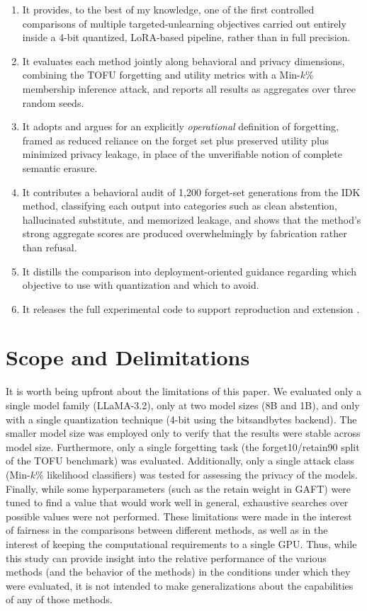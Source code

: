 \documentclass[a4paper,12pt]{report}
\begin{document}
\begin{enumerate}
	\item It provides, to the best of my knowledge, one of the first controlled comparisons of multiple targeted-unlearning objectives carried out entirely inside a 4-bit quantized, LoRA-based pipeline, rather than in full precision.
	\item It evaluates each method jointly along behavioral and privacy dimensions, combining the TOFU forgetting and utility metrics with a Min-$k$\% membership inference attack, and reports all results as aggregates over three random seeds.
	\item It adopts and argues for an explicitly \emph{operational} definition of forgetting, framed as reduced reliance on the forget set plus preserved utility plus minimized privacy leakage, in place of the unverifiable notion of complete semantic erasure.
	\item It contributes a behavioral audit of 1{,}200 forget-set generations from the IDK method, classifying each output into categories such as clean abstention, hallucinated substitute, and memorized leakage, and shows that the method's strong aggregate scores are produced overwhelmingly by fabrication rather than refusal.
	\item It distills the comparison into deployment-oriented guidance regarding which objective to use with quantization and which to avoid.
	\item It releases the full experimental code to support reproduction and extension \parencite{ali2026code}.
\end{enumerate}

\section{Scope and Delimitations}
It is worth being upfront about the limitations of this paper. We evaluated only a single model family (LLaMA-3.2), only at two model sizes (8B and 1B), and only with a single quantization technique (4-bit using the bitsandbytes backend). The smaller model size was employed only to verify that the results were stable across model size. Furthermore, only a single forgetting task (the forget10/retain90 split of the TOFU benchmark) was evaluated. Additionally, only a single attack class (Min-$k$\% likelihood classifiers) was tested for assessing the privacy of the models. Finally, while some hyperparameters (such as the retain weight in GAFT) were tuned to find a value that would work well in general, exhaustive searches over possible values were not performed. These limitations were made in the interest of fairness in the comparisons between different methods, as well as in the interest of keeping the computational requirements to a single GPU. Thus, while this study can provide insight into the relative performance of the various methods (and the behavior of the methods) in the conditions under which they were evaluated, it is not intended to make generalizations about the capabilities of any of those methods.
\end{document}
